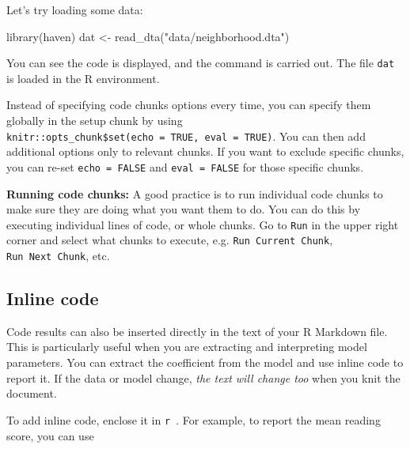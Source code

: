 \documentclass[
  letterpaper,
  DIV=11,
  numbers=noendperiod]{scrreprt}
\newenvironment{Shaded}{}{}
\newcommand{\AttributeTok}[1]{\textcolor[rgb]{0.49,0.56,0.16}{#1}}
\newcommand{\FunctionTok}[1]{\textcolor[rgb]{0.02,0.16,0.49}{#1}}
\newcommand{\NormalTok}[1]{#1}
\newcommand{\OtherTok}[1]{\textcolor[rgb]{0.00,0.44,0.13}{#1}}
\newcommand{\StringTok}[1]{\textcolor[rgb]{0.25,0.44,0.63}{#1}}
\begin{document}
Let's try loading some data:

\begin{Shaded}
\begin{Highlighting}[]
\FunctionTok{library}\NormalTok{(haven)}
\NormalTok{dat }\OtherTok{\textless{}{-}} \FunctionTok{read\_dta}\NormalTok{(}\StringTok{"data/neighborhood.dta"}\NormalTok{)}
\end{Highlighting}
\end{Shaded}

You can see the code is displayed, and the command is carried out. The
file \texttt{dat} is loaded in the R environment.

Instead of specifying code chunks options every time, you can specify
them globally in the setup chunk by using
\texttt{knitr::opts\_chunk\$set(echo\ =\ TRUE,\ eval\ =\ TRUE)}. You can
then add additional options only to relevant chunks. If you want to
exclude specific chunks, you can re-set \texttt{echo\ =\ FALSE} and
\texttt{eval\ =\ FALSE} for those specific chunks.

\textbf{Running code chunks:} A good practice is to run individual code
chunks to make sure they are doing what you want them to do. You can do
this by executing individual lines of code, or whole chunks. Go to
\texttt{Run} in the upper right corner and select what chunks to
execute, e.g. \texttt{Run\ Current\ Chunk}, \texttt{Run\ Next\ Chunk},
etc.

\subsection{Inline code}\label{inline-code}

Code results can also be inserted directly in the text of your R
Markdown file. This is particularly useful when you are extracting and
interpreting model parameters. You can extract the coefficient from the
model and use inline code to report it. If the data or model change,
\emph{the text will change too} when you knit the document.

To add inline code, enclose it in
\texttt{\textasciigrave{}r\ \textasciigrave{}}. For example, to report
the mean reading score, you can use

\begin{Shaded}
\end{Shaded}
\end{document}
